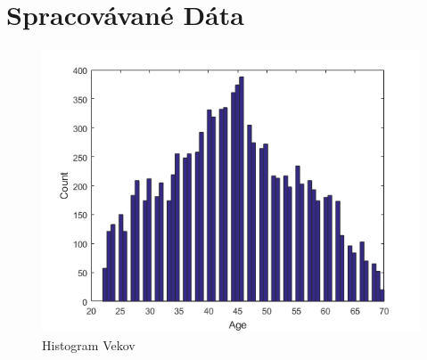 \section{Spracovávané Dáta}



\begin{figure}[h!]
	\centering
  		\includegraphics[width=1.0\textwidth]{ages.png}
  	\caption{Histogram Vekov}
\end{figure}